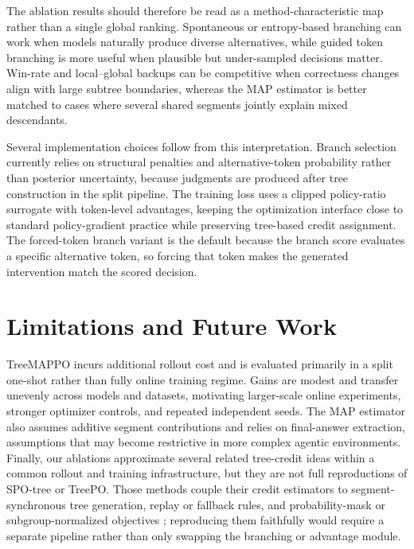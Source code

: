 \documentclass{article}
\begin{document}
The ablation results should therefore be read as a method-characteristic map rather than a single global ranking. Spontaneous or entropy-based branching can work when models naturally produce diverse alternatives, while guided token branching is more useful when plausible but under-sampled decisions matter. Win-rate and local--global backups can be competitive when correctness changes align with large subtree boundaries, whereas the MAP estimator is better matched to cases where several shared segments jointly explain mixed descendants.

Several implementation choices follow from this interpretation. Branch selection currently relies on structural penalties and alternative-token probability rather than posterior uncertainty, because judgments are produced after tree construction in the split pipeline. The training loss uses a clipped policy-ratio surrogate with token-level advantages, keeping the optimization interface close to standard policy-gradient practice while preserving tree-based credit assignment. The forced-token branch variant is the default because the branch score evaluates a specific alternative token, so forcing that token makes the generated intervention match the scored decision.

\section{Limitations and Future Work}
TreeMAPPO incurs additional rollout cost and is evaluated primarily in a split one-shot rather than fully online training regime. Gains are modest and transfer unevenly across models and datasets, motivating larger-scale online experiments, stronger optimizer controls, and repeated independent seeds. The MAP estimator also assumes additive segment contributions and relies on final-answer extraction, assumptions that may become restrictive in more complex agentic environments. Finally, our ablations approximate several related tree-credit ideas within a common rollout and training infrastructure, but they are not full reproductions of SPO-tree or TreePO. Those methods couple their credit estimators to segment-synchronous tree generation, replay or fallback rules, and probability-mask or subgroup-normalized objectives \cite{spo2025,treepo2025}; reproducing them faithfully would require a separate pipeline rather than only swapping the branching or advantage module.
\end{document}
